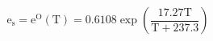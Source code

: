 \documentclass[12pt]{article}
\begin{document}
\begin{displaymath}
\mathrm{e}_{\mathrm{s}}=\mathrm{e}^{\mathrm{O}}(\mathrm{T})=0.6108 \exp \left(\frac{17.27 \mathrm{T}}{\mathrm{T}+237.3}\right)
\end{displaymath}
\end{document}
